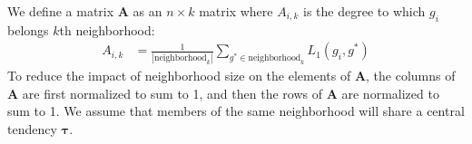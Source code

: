         We define a matrix $\mathbf{A}$ as an $n \times k$ matrix where
        $A_{i, k}$ is the degree to which $g_i$ belongs $k$th neighborhood:
        \begin{align}
            A_{i, k} &= \frac{1}{|\text{neighborhood}_k|}\sum_{
                g^* \in \text{neighborhood}_k}{L_1(g_i, g^*)}
        \end{align}
        To reduce the impact of neighborhood size on the elements
        of $\mathbf{A}$, the columns of $\mathbf{A}$ are first
        normalized to sum to 1, and then the rows of $\mathbf{A}$
        are normalized to sum to 1. We assume that members of the
        same neighborhood will share a central tendency $\mathbf{\tau}$.
